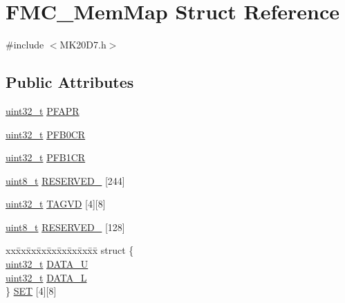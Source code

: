 \hypertarget{struct_f_m_c___mem_map}{}\section{F\+M\+C\+\_\+\+Mem\+Map Struct Reference}
\label{struct_f_m_c___mem_map}


{\ttfamily \#include $<$M\+K20\+D7.\+h$>$}

\subsection*{Public Attributes}
\begin{DoxyCompactItemize}
\item 
\hyperlink{_p_e___types_8h_a33594304e786b158f3fb30289278f5af}{uint32\+\_\+t} \hyperlink{struct_f_m_c___mem_map_a5b2a2d13262d7ed59ccc7b55e932797f}{P\+F\+A\+PR}
\item 
\hyperlink{_p_e___types_8h_a33594304e786b158f3fb30289278f5af}{uint32\+\_\+t} \hyperlink{struct_f_m_c___mem_map_a71d841ed263f133591205a427cfbf341}{P\+F\+B0\+CR}
\item 
\hyperlink{_p_e___types_8h_a33594304e786b158f3fb30289278f5af}{uint32\+\_\+t} \hyperlink{struct_f_m_c___mem_map_a4f1e0f3859071a0a5bbb2658d3c50008}{P\+F\+B1\+CR}
\item 
\hyperlink{_p_e___types_8h_aba7bc1797add20fe3efdf37ced1182c5}{uint8\+\_\+t} \hyperlink{struct_f_m_c___mem_map_a548529dff72d32964daf52897500e275}{R\+E\+S\+E\+R\+V\+E\+D\+\_} \mbox{[}244\mbox{]}
\item 
\hyperlink{_p_e___types_8h_a33594304e786b158f3fb30289278f5af}{uint32\+\_\+t} \hyperlink{struct_f_m_c___mem_map_a128170fe1e6d805804269b40d597122a}{T\+A\+G\+VD} \mbox{[}4\mbox{]}\mbox{[}8\mbox{]}
\item 
\hyperlink{_p_e___types_8h_aba7bc1797add20fe3efdf37ced1182c5}{uint8\+\_\+t} \hyperlink{struct_f_m_c___mem_map_ac7adf0bcbdd849e124b5d116f108f18c}{R\+E\+S\+E\+R\+V\+E\+D\+\_} \mbox{[}128\mbox{]}
\item 
\begin{tabbing}
xx\=xx\=xx\=xx\=xx\=xx\=xx\=xx\=xx\=\kill
struct \{\\
\>\hyperlink{_p_e___types_8h_a33594304e786b158f3fb30289278f5af}{uint32\_t} \hyperlink{struct_f_m_c___mem_map_acd323327704230c8d13c021730d39c15}{DATA\_U}\\
\>\hyperlink{_p_e___types_8h_a33594304e786b158f3fb30289278f5af}{uint32\_t} \hyperlink{struct_f_m_c___mem_map_a697bb0356541fe920260e33d29bf0698}{DATA\_L}\\
\} \hyperlink{struct_f_m_c___mem_map_a022afa677b59fb18514e1c7868ca0176}{SET} \mbox{[}4\mbox{]}\mbox{[}8\mbox{]}\\


\end{tabbing}
\end{DoxyCompactItemize}
